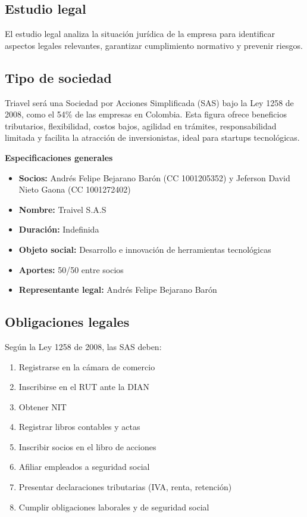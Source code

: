\subsection{Estudio legal}
El estudio legal analiza la situación jurídica de la empresa para identificar aspectos legales relevantes, garantizar cumplimiento normativo y prevenir riesgos.

\subsection*{Tipo de sociedad}
Triavel será una Sociedad por Acciones Simplificada (SAS) bajo la Ley 1258 de 2008, como el 54\% de las empresas en Colombia. Esta figura ofrece beneficios tributarios, flexibilidad, costos bajos, agilidad en trámites, responsabilidad limitada y facilita la atracción de inversionistas, ideal para startups tecnológicas.

\textbf{Especificaciones generales}
\newline
\begin{itemize}
    \item \textbf{Socios:} Andrés Felipe Bejarano Barón (CC 1001205352) y Jeferson David Nieto Gaona (CC 1001272402)
    \item \textbf{Nombre:} Traivel S.A.S
    \item \textbf{Duración:} Indefinida
    \item \textbf{Objeto social:} Desarrollo e innovación de herramientas tecnológicas
    \item \textbf{Aportes:} 50/50 entre socios
    \item \textbf{Representante legal:} Andrés Felipe Bejarano Barón
\end{itemize}

\subsection*{Obligaciones legales}
Según la Ley 1258 de 2008, las SAS deben:
\begin{enumerate}
    \item Registrarse en la cámara de comercio
    \item Inscribirse en el RUT ante la DIAN
    \item Obtener NIT
    \item Registrar libros contables y actas
    \item Inscribir socios en el libro de acciones
    \item Afiliar empleados a seguridad social
    \item Presentar declaraciones tributarias (IVA, renta, retención)
    \item Cumplir obligaciones laborales y de seguridad social
\end{enumerate}

